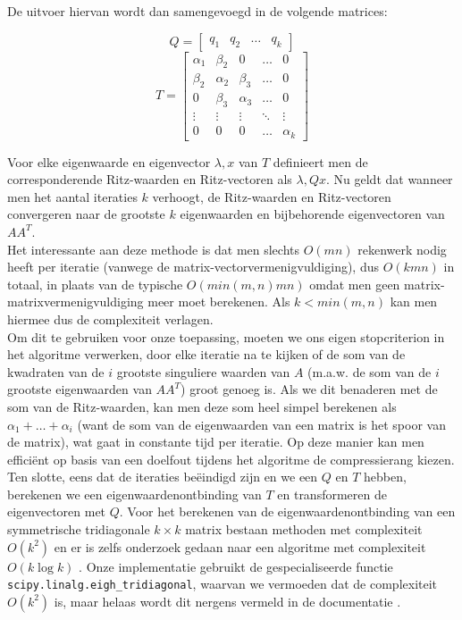 De uitvoer hiervan wordt dan samengevoegd in de volgende matrices:

\[
Q = 
\begin{bmatrix}
    q_1 & q_2 & \dots & q_k
\end{bmatrix}
\]
\[
T = \begin{bmatrix}
\alpha_1 & \beta_2 & 0 & \dots & 0 \\
\beta_2 & \alpha_2 & \beta_3 & \dots & 0 \\
0 & \beta_3 & \alpha_3 & \dots & 0 \\
\vdots & \vdots & \vdots & \ddots & \vdots \\
0 & 0 & 0 & \dots & \alpha_k
\end{bmatrix}
\]

Voor elke eigenwaarde en eigenvector $\lambda, x$ van $T$ definieert men de corresponderende Ritz-waarden en Ritz-vectoren als $\lambda, Qx$. Nu geldt dat wanneer men het aantal iteraties $k$ verhoogt, de Ritz-waarden en Ritz-vectoren convergeren naar de grootste $k$ eigenwaarden en bijbehorende eigenvectoren van $A A^T$.\\

Het interessante aan deze methode is dat men slechts $O(mn)$ rekenwerk nodig heeft per iteratie (vanwege de matrix-vectorvermenigvuldiging), dus $O(kmn)$ in totaal, in plaats van de typische $O(min(m, n)mn)$ omdat men geen matrix-matrixvermenigvuldiging meer moet berekenen. Als $k < min(m, n)$ kan men hiermee dus de complexiteit verlagen.\\

Om dit te gebruiken voor onze toepassing, moeten we ons eigen stopcriterion in het algoritme verwerken, door elke iteratie na te kijken of de som van de kwadraten van de $i$ grootste singuliere waarden van $A$ (m.a.w. de som van de $i$ grootste eigenwaarden van $A A^T$) groot genoeg is. Als we dit benaderen met de som van de Ritz-waarden, kan men deze som heel simpel berekenen als $\alpha_1 + \dots + \alpha_i$ (want de som van de eigenwaarden van een matrix is het spoor van de matrix), wat gaat in constante tijd per iteratie. Op deze manier kan men effici\"ent op basis van een doelfout tijdens het algoritme de compressierang kiezen.\\

Ten slotte, eens dat de iteraties be\"eindigd zijn en we een $Q$ en $T$ hebben, berekenen we een eigenwaardenontbinding van $T$ en transformeren de eigenvectoren met $Q$. Voor het berekenen van de eigenwaardenontbinding van een symmetrische tridiagonale $k \times k$ matrix bestaan methoden met complexiteit $O(k^2)$ en er is zelfs onderzoek gedaan naar een algoritme met complexiteit $O(k \log{k})$ \cite{ref:coakley}. Onze implementatie gebruikt de gespecialiseerde functie \texttt{scipy.linalg.eigh\_tridiagonal}, waarvan we vermoeden dat de complexiteit $O(k^2)$ is, maar helaas wordt dit nergens vermeld in de documentatie \cite{ref:eigh_tridiagonal}.

